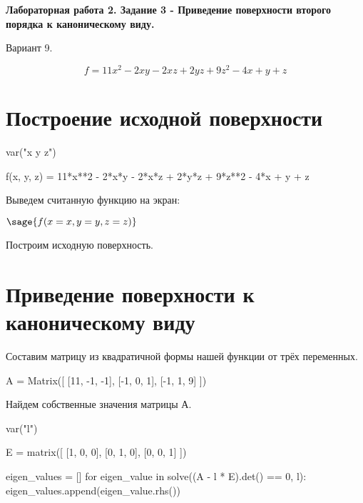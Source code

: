 \documentclass{article}
\begin{document}
\begin{center}
\Large{\textbf{Лабораторная работа 2. Задание 3 - Приведение поверхности второго порядка к каноническому виду.}}
\end{center}

\begin{center}
Вариант 9. 
\end{center}
$$f = 11x^2 - 2xy - 2xz + 2yz + 9z^2 - 4x + y + z$$

\section{Построение исходной поверхности}
\begin{sagesilent}
var("x y z")
\end{sagesilent}
\begin{sageblock}
f(x, y, z) = 11*x**2 - 2*x*y - 2*x*z + 2*y*z + 9*z**2 - 4*x + y + z
\end{sageblock}

Выведем считанную функцию на экран:

\begin{center}
$\sage{f(x=x, y=y, z=z)}$
\end{center}

Построим исходную поверхность.

\begin{center}
\end{center}

\section{Приведение поверхности к каноническому виду}
Составим матрицу из квадратичной формы нашей функции от трёх переменных.

\begin{sageblock}
A = Matrix([
    [11, -1, -1], 
    [-1, 0, 1], 
    [-1, 1, 9]
  ])
\end{sageblock}

Найдем собственные значения матрицы А.

\begin{sagesilent}
var("l")
\end{sagesilent}

\begin{sageblock}
E = matrix([
    [1, 0, 0],
    [0, 1, 0],
    [0, 0, 1]
])

eigen_values = []
for eigen_value in solve((A - l * E).det() == 0, l):
    eigen_values.append(eigen_value.rhs())

\end{sageblock}
\end{document}
